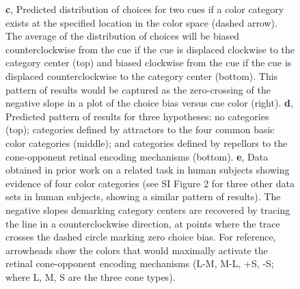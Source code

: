 \begin{figure}
\begin{fullwidth}
{	\textbf{c}, Predicted distribution of choices for two cues if a color category exists at the specified location in the color space (dashed arrow). 
	The average of the distribution of choices will be biased counterclockwise from the cue if the cue is displaced clockwise to the category center (top) and biased clockwise from the cue if the cue is displaced counterclockwise to the category center (bottom). This pattern of results would be captured as the zero-crossing of the negative slope in a plot of the choice bias versus cue color (right). 
	\textbf{d}, Predicted pattern of results for three hypotheses: no categories (top); categories defined by attractors to the four common basic color categories (middle); and categories defined by repellors to the cone-opponent retinal encoding mechanisms (bottom). 
	\textbf{e}, Data obtained in prior work on a related task in human subjects \citep{panichello_error-correcting_2019} showing evidence of four color categories (see SI Figure 2 for three other data sets in human subjects, showing a similar pattern of results). The negative slopes demarking category centers are recovered by tracing the line in a counterclockwise direction, at points where the trace crosses the dashed circle marking zero choice bias. For reference, arrowheads show the colors that would maximally activate the retinal cone-opponent encoding mechanisms (L-M, M-L, +S, -S; where L, M, S are the three cone types).}
    \label{fig:ParadigmAnalysisPredictions}
    \end{fullwidth}
\end{figure}

